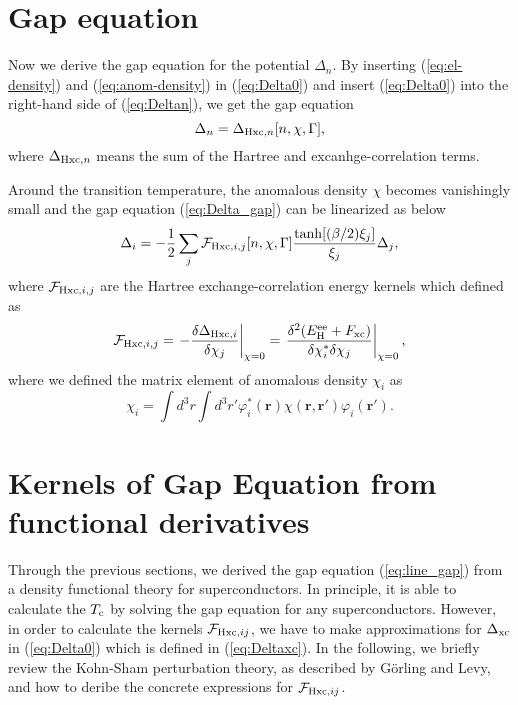 \section{Gap equation}
%
Now we derive the gap equation for the potential $\Delta_n$. By inserting (\ref{eq:el-density}) 
and (\ref{eq:anom-density}) in (\ref{eq:Delta0}) and insert (\ref{eq:Delta0}) into the 
right-hand side of (\ref{eq:Deltan}), we get the gap equation
%
\begin{equation}
	\Delta_n = \Delta_{{\rm Hxc}, n}[n, \chi, \Gamma],
	\label{eq:Delta_gap}
\end{equation}
%
where $\Delta_{{\rm Hxc},n}$ means the sum of the Hartree and excanhge-correlation terms.

Around the transition temperature, the anomalous density $\chi$ becomes vanishingly small 
and the gap equation (\ref{eq:Delta_gap}) can be linearized as below
%
\begin{equation}
	\Delta_i = -\frac{1}{2}\sum_{j} {\mathcal F}_{{\rm Hxc}, i,j}[n, \chi, \Gamma]
	\frac{\tanh[(\beta/2)\xi_j]}{\xi_j}\Delta_j,
	\label{eq:line_gap}
\end{equation}
%
where ${\mathcal F}_{{\rm Hxc}, i,j}$ are the Hartree exchange-correlation energy kernels which defined as
%
\begin{equation}
	{\mathcal F}_{{\rm Hxc},i,j} = \left. -\frac{\delta \Delta_{{\rm Hxc}, i}}{\delta \chi_j} 
	                               \right|_{\chi = 0}
				       = \left. \frac{\delta^2(E^{\rm ee}_{\rm H}+F_{\rm xc})}
				       {\delta \chi^{\ast}_i \delta \chi_j} \right|_{\chi = 0},
	\label{eq:def-fxc}
\end{equation}
%
where we defined the matrix element of anomalous density $\chi_i$ as
%
\begin{equation}
	\chi_i = \int d^3r\int d^3r' \varphi^{\ast}_i(\bm{r})\chi(\bm{r}, \bm{r'})\varphi_i(\bm{r'}).
	\label{eq:chi_i_def}
\end{equation}
%

\section{Kernels of Gap Equation from functional derivatives}

Through the previous sections, we derived the gap equation (\ref{eq:line_gap}) from a density functional
theory for superconductors. In principle, it is able to calculate the $T_{\rm c}$ by solving 
the gap equation for any superconductors. However, in order to calculate the kernels 
${\mathcal F}_{{\rm Hxc},ij}$, 
we have to make approximations for $\Delta_{\rm xc}$ in (\ref{eq:Delta0}) which is defined in
(\ref{eq:Deltaxc}). In the following, we briefly review the Kohn-Sham perturbation theory,
as described by G\"{o}rling and Levy\cite{Levy1994}, 
and how to deribe the concrete expressions for ${\mathcal F}_{{\rm Hxc},ij}$.

